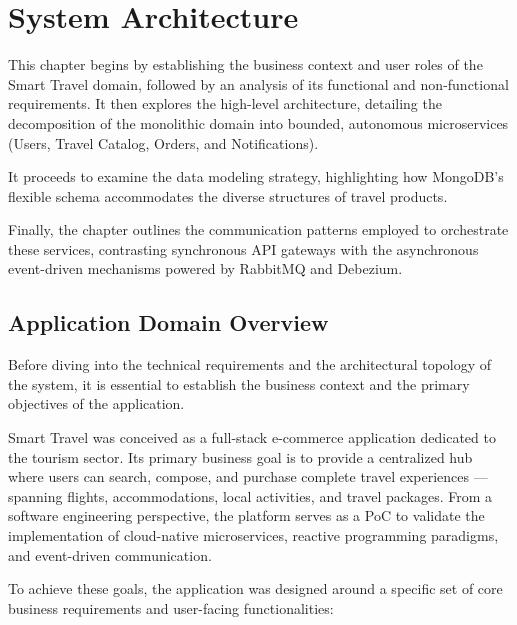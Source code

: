 \chapter{System Architecture}
\label{sec:architecture}

This chapter begins by establishing the business context and user roles of the Smart Travel domain, followed by an analysis of its functional and non-functional requirements. It then explores the high-level architecture, detailing the decomposition of the monolithic domain into bounded, autonomous microservices (Users, Travel Catalog, Orders, and Notifications). 

It proceeds to examine the data modeling strategy, highlighting how MongoDB's flexible schema accommodates the diverse structures of travel products. 

Finally, the chapter outlines the communication patterns employed to orchestrate these services, contrasting synchronous API gateways with the asynchronous event-driven mechanisms powered by RabbitMQ and Debezium.


\section{Application Domain Overview}
\label{sec:domain_overview}

Before diving into the technical requirements and the architectural topology of the system, it is essential to establish the business context and the primary objectives of the application. 

Smart Travel was conceived as a full-stack e-commerce application dedicated to the tourism sector. Its primary business goal is to provide a centralized hub where users can search, compose, and purchase complete travel experiences — spanning flights, accommodations, local activities, and travel packages. From a software engineering perspective, the platform serves as a \gls{PoC} to validate the implementation of cloud-native microservices, reactive programming paradigms, and event-driven communication.

To achieve these goals, the application was designed around a specific set of core business requirements and user-facing functionalities:

